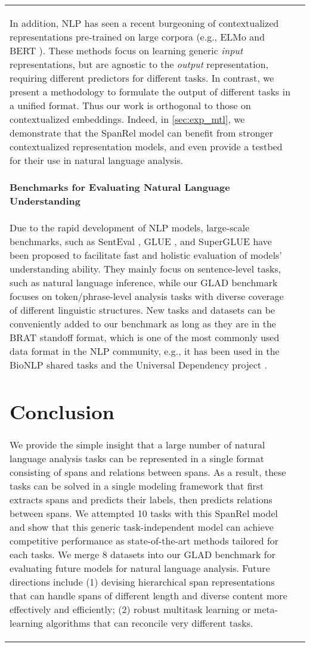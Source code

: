 \documentclass[11pt,a4paper]{article}
\def\modelname{SpanRel\xspace}
\def\benchmarkname{GLAD\xspace}
\begin{document}
\begin{table*}[tb]
\begin{subtable}[t]{0.47\textwidth}
{\begin{tabular}[t]{ll}
In addition, NLP has seen a recent burgeoning of contextualized representations pre-trained on large corpora (e.g., ELMo \citep{peters-etal-2018-deep} and BERT \citep{devlin-etal-2019-bert}).
These methods focus on learning generic \emph{input} representations, but are agnostic to the \emph{output} representation, requiring different predictors  for different tasks. In contrast, we present a methodology to formulate the output of different tasks in a unified format.
Thus our work is orthogonal to those on contextualized embeddings.
Indeed, in \autoref{sec:exp_mtl}, we demonstrate that the \modelname model can benefit from stronger contextualized representation models, and even provide a testbed for their use in natural language analysis.

\paragraph{Benchmarks for Evaluating Natural Language Understanding} Due to the rapid development of NLP models, large-scale benchmarks, such as SentEval \citep{conneau-kiela-2018-senteval}, GLUE \citep{wang:19:glue}, and SuperGLUE \citep{wang:19:superglue} have been proposed to facilitate fast and holistic evaluation of models' understanding ability.
They mainly focus on sentence-level tasks, such as natural language inference, while our \benchmarkname benchmark focuses on token/phrase-level analysis tasks with diverse coverage of different linguistic structures.
New tasks and datasets can be conveniently added to our benchmark as long as they are in the BRAT standoff format, which is one of the most commonly used data format in the NLP community, e.g., it has been used in the BioNLP shared tasks \citep{kim:2009:bionlp} and the Universal Dependency project \citep{mcdonald-etal-2013-universal}.

\section{Conclusion}
We provide the simple insight that a large number of natural language analysis tasks can be represented in a single format consisting of spans and relations between spans.
As a result, these tasks can be solved in a single modeling framework that first extracts spans and predicts their labels, then predicts relations between spans.
We attempted 10 tasks with this \modelname model and show that this generic task-independent model can achieve competitive performance as state-of-the-art methods tailored for each tasks.
We merge 8 datasets into our \benchmarkname benchmark for evaluating future models for natural language analysis.
Future directions include (1) devising hierarchical span representations that can handle spans of different length and diverse content more effectively and efficiently; (2) robust multitask learning or meta-learning algorithms that can reconcile very different tasks.


\end{tabular}}
\end{subtable}
\end{table*}
\end{document}
